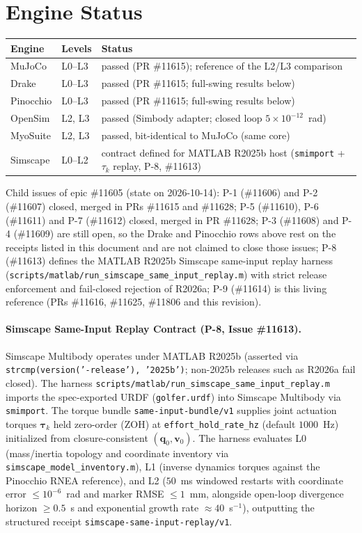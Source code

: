 \documentclass[11pt,a4paper]{article}
\newcommand{\bq}{\mathbf{q}}
\newcommand{\bv}{\mathbf{v}}
\newcommand{\bt}{\boldsymbol{\tau}}
\begin{document}
\section{Engine Status}
\begin{table}[h]
\centering\small
\begin{tabular}{lll}
\toprule
Engine & Levels & Status\\
\midrule
MuJoCo & L0--L3 & passed (PR \#11615); reference of the L2/L3 comparison\\
Drake & L0--L3 & passed (PR \#11615; full-swing results below)\\
Pinocchio & L0--L3 & passed (PR \#11615; full-swing results below)\\
OpenSim & L2, L3 & passed (Simbody adapter; closed loop $5\times10^{-12}$~rad)\\
MyoSuite & L2, L3 & passed, bit-identical to MuJoCo (same core)\\
Simscape & L0--L2 & contract defined for MATLAB R2025b host (\texttt{smimport} + $\tau_k$ replay, P-8, \#11613)\\
\bottomrule
\end{tabular}
\end{table}

Child issues of epic \#11605 (state on 2026-10-14): P-1 (\#11606) and P-2
(\#11607) closed, merged in PRs \#11615 and \#11628; P-5 (\#11610), P-6
(\#11611) and P-7 (\#11612) closed, merged in PR \#11628; P-3 (\#11608) and
P-4 (\#11609) are still open, so the Drake and Pinocchio rows above rest on the
receipts listed in this document and are not claimed to close those issues;
P-8 (\#11613) defines the MATLAB R2025b Simscape same-input replay harness
(\texttt{scripts/matlab/run\_simscape\_same\_input\_replay.m}) with strict release
enforcement and fail-closed rejection of R2026a; P-9 (\#11614) is this living
reference (PRs \#11616, \#11625, \#11806 and this revision).

\paragraph{Simscape Same-Input Replay Contract (P-8, Issue \#11613).}
Simscape Multibody operates under MATLAB R2025b (asserted via
\texttt{strcmp(version('-release'), '2025b')}; non-2025b releases such as R2026a
fail closed).  The harness \texttt{scripts/matlab/run\_simscape\_same\_input\_replay.m}
imports the spec-exported URDF (\texttt{golfer.urdf}) into Simscape Multibody
via \texttt{smimport}.  The torque bundle \texttt{same-input-bundle/v1} supplies
joint actuation torques $\bt_k$ held zero-order (ZOH) at \texttt{effort\_hold\_rate\_hz}
(default $1000$~Hz) initialized from closure-consistent $(\bq_0, \bv_0)$.
The harness evaluates L0 (mass/inertia topology and coordinate inventory via
\texttt{simscape\_model\_inventory.m}), L1 (inverse dynamics torques against the
Pinocchio RNEA reference), and L2 ($50$~ms windowed restarts with coordinate
error $\le 10^{-6}$~rad and marker RMSE $\le 1$~mm, alongside open-loop divergence
horizon $\ge 0.5$~s and exponential growth rate $\approx 40$~s$^{-1}$), outputting
the structured receipt \texttt{simscape-same-input-replay/v1}.
\end{document}
